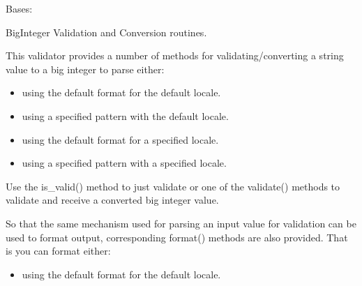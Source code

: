 \documentclass[letterpaper,10pt,english]{sphinxmanual}
\begin{document}
\begin{fulllineitems}
\label{\detokenize{apache_commons_validator_python.routines:apache_commons_validator_python.routines.big_integer_validator.BigIntegerValidator}}
\pysigstartsignatures
{}
\pysigstopsignatures
\sphinxAtStartPar
Bases: {\hyperref[\detokenize{apache_commons_validator_python.routines:apache_commons_validator_python.routines.abstract_number_validator.AbstractNumberValidator}]{}}

\sphinxAtStartPar
BigInteger Validation and Conversion routines.

\sphinxAtStartPar
This validator provides a number of methods for validating/converting a string value
to a big integer to parse either:
\begin{itemize}
\item {} 
\sphinxAtStartPar
using the default format for the default locale.

\item {} 
\sphinxAtStartPar
using a specified pattern with the default locale.

\item {} 
\sphinxAtStartPar
using the default format for a specified locale.

\item {} 
\sphinxAtStartPar
using a specified pattern with a specified locale.

\end{itemize}

\sphinxAtStartPar
Use the is\_valid() method to just validate or one of the validate() methods to
validate and receive a converted big integer value.

\sphinxAtStartPar
So that the same mechanism used for parsing an input value for validation can be used to format output,
corresponding format() methods are also provided. That is you can format either:
\begin{itemize}
\item {} 
\sphinxAtStartPar
using the default format for the default locale.


\end{itemize}
\end{fulllineitems}
\end{document}
